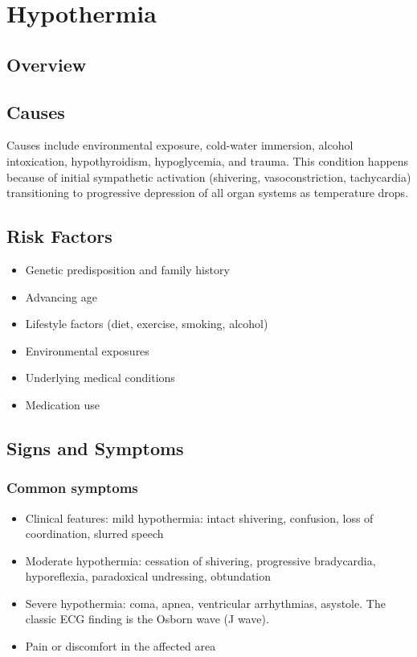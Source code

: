 \chapter{Hypothermia}
\label{sec:Hypothermia}

\section{Overview}

\section{Causes}
Causes include environmental exposure, cold-water immersion, alcohol intoxication, hypothyroidism, hypoglycemia, and trauma. This condition happens because of initial sympathetic activation (shivering, vasoconstriction, tachycardia) transitioning to progressive depression of all organ systems as temperature drops.     
\section{Risk Factors}

\begin{itemize}[noitemsep]
  \item Genetic predisposition and family history
  \item Advancing age
  \item Lifestyle factors (diet, exercise, smoking, alcohol)
  \item Environmental exposures
  \item Underlying medical conditions
  \item Medication use
\end{itemize}
\section{Signs and Symptoms}

\subsection{Common symptoms}
\begin{itemize}[noitemsep]
  \item Clinical features: mild hypothermia: intact shivering, confusion, loss of coordination, slurred speech
  \item Moderate hypothermia: cessation of shivering, progressive bradycardia, hyporeflexia, paradoxical undressing, obtundation
  \item Severe hypothermia: coma, apnea, ventricular arrhythmias, asystole. The classic ECG finding is the Osborn wave (J wave).
  \item Pain or discomfort in the affected area
  \end{itemize}

